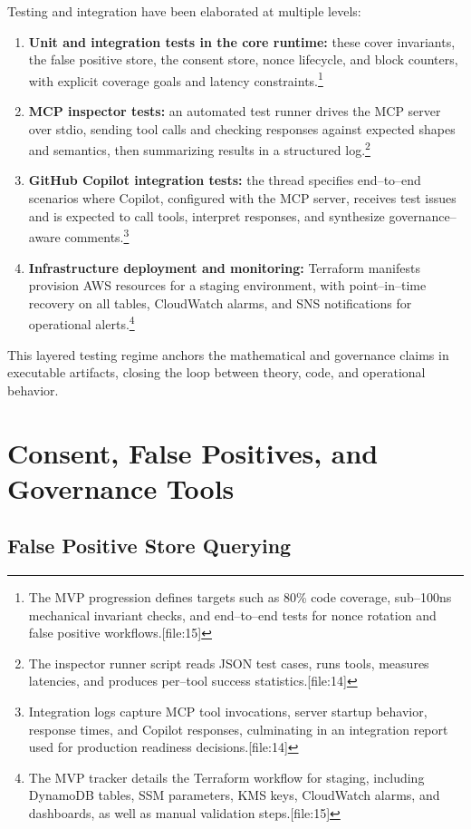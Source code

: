 \documentclass[11pt]{article}
\begin{document}
Testing and integration have been elaborated at multiple levels:
\begin{enumerate}[leftmargin=*]
  \item \textbf{Unit and integration tests in the core runtime:} these cover invariants, the false positive store, the consent store, nonce lifecycle, and block counters, with explicit coverage goals and latency constraints.\footnote{The MVP progression defines targets such as 80\% code coverage, sub--100ns mechanical invariant checks, and end--to--end tests for nonce rotation and false positive workflows.[file:15]} 
  \item \textbf{MCP inspector tests:} an automated test runner drives the MCP server over stdio, sending tool calls and checking responses against expected shapes and semantics, then summarizing results in a structured log.\footnote{The inspector runner script reads JSON test cases, runs tools, measures latencies, and produces per--tool success statistics.[file:14]} 
  \item \textbf{GitHub Copilot integration tests:} the thread specifies end--to--end scenarios where Copilot, configured with the MCP server, receives test issues and is expected to call tools, interpret responses, and synthesize governance--aware comments.\footnote{Integration logs capture MCP tool invocations, server startup behavior, response times, and Copilot responses, culminating in an integration report used for production readiness decisions.[file:14]} 
  \item \textbf{Infrastructure deployment and monitoring:} Terraform manifests provision AWS resources for a staging environment, with point--in--time recovery on all tables, CloudWatch alarms, and SNS notifications for operational alerts.\footnote{The MVP tracker details the Terraform workflow for staging, including DynamoDB tables, SSM parameters, KMS keys, CloudWatch alarms, and dashboards, as well as manual validation steps.[file:15]} 
\end{enumerate}

This layered testing regime anchors the mathematical and governance claims in executable artifacts, closing the loop between theory, code, and operational behavior.

\section{Consent, False Positives, and Governance Tools}

\subsection{False Positive Store Querying}
\end{document}
